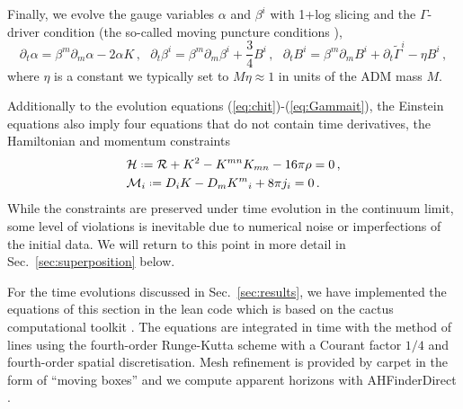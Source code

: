\documentclass[11pt]{report}  %
\newcommand*{\defeq}{\mathrel{\vcenter{\baselineskip0.5ex \lineskiplimit0pt
                     \hbox{\scriptsize.}\hbox{\scriptsize.}}}%
                     =}
\begin{document}
Finally, we evolve the gauge variables $\alpha$ and $\beta^i$
with 1+log slicing and the $\Gamma$-driver condition
(the so-called moving puncture conditions
\cite{Campanelli:2005dd,Baker:2005vv}),
%
\begin{equation}
  \partial_t \alpha = \beta^m \partial_m \alpha
  -2\alpha K
  \,,~~~
  \partial_t \beta^i = \beta^m\partial_m \beta^i
  +\frac{3}{4}B^i
  \,,~~~
  \partial_t B^i = \beta^m \partial_m B^i
  +\partial_t \tilde{\Gamma}^i
  -\eta B^i\,,
\end{equation}
%
where $\eta$ is a constant we typically set to $M\eta\approx 1$
in units of the ADM mass $M$.

Additionally to the evolution equations (\ref{eq:chit})-(\ref{eq:Gammait}),
the Einstein equations also imply four equations that do not contain time
derivatives, the Hamiltonian and momentum constraints
%
\begin{align}
  &\mathcal{H} \defeq \mathcal{R}+K^2-K^{mn}K_{mn} - 16\pi \rho = 0\,,
  \label{eq:ham} \\
  &\mathcal{M}_i\defeq D_i K - D_m K^m{}_i + 8\pi j_i = 0\,.
  \label{eq:mom}
\end{align}
%
While the constraints are preserved under time evolution in the continuum limit,
some level of violations is inevitable due to numerical noise or imperfections
of the initial data. We will return to this point in more detail in
Sec.~\ref{sec:superposition} below.

For the time evolutions discussed in Sec.~\ref{sec:results},
we have implemented the equations of this section in the
{\sc lean} code \cite{Sperhake:2006cy} which is based on the
{\sc cactus} computational toolkit \cite{Allen:1999}. The
equations are integrated in time with the method of lines
using the fourth-order Runge-Kutta scheme with a
Courant factor $1/4$ and fourth-order
spatial discretisation. Mesh refinement is provided by
{\sc carpet} \cite{Schnetter:2003rb} in the form of ``moving
boxes'' and we compute apparent horizons with
{\sc AHFinderDirect} \cite{Thornburg:1995cp,Thornburg:2003sf}.
\end{document}
